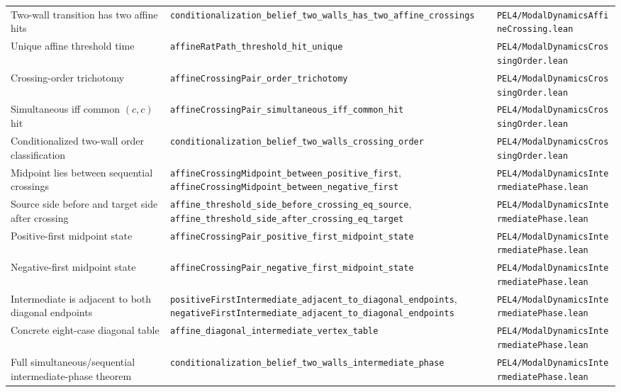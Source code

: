 \begin{longtable}{@{}p{}p{}p{}@{}}
\addlinespace
Two-wall transition has two affine hits & \texttt{conditionalization\_belief\_two\_walls\_has\_two\_affine\_crossings} & \texttt{PEL4/ModalDynamicsAffineCrossing.lean}\\
\addlinespace
Unique affine threshold time & \texttt{affineRatPath\_threshold\_hit\_unique} & \texttt{PEL4/ModalDynamicsCrossingOrder.lean}\\
\addlinespace
Crossing-order trichotomy & \texttt{affineCrossingPair\_order\_trichotomy} & \texttt{PEL4/ModalDynamicsCrossingOrder.lean}\\
\addlinespace
Simultaneous iff common \((c,c)\) hit & \texttt{affineCrossingPair\_simultaneous\_iff\_common\_hit} & \texttt{PEL4/ModalDynamicsCrossingOrder.lean}\\
\addlinespace
Conditionalized two-wall order classification & \texttt{conditionalization\_belief\_two\_walls\_crossing\_order} & \texttt{PEL4/ModalDynamicsCrossingOrder.lean}\\
\addlinespace
Midpoint lies between sequential crossings & \texttt{affineCrossingMidpoint\_between\_positive\_first}, \texttt{affineCrossingMidpoint\_between\_negative\_first} & \texttt{PEL4/ModalDynamicsIntermediatePhase.lean}\\
\addlinespace
Source side before and target side after crossing & \texttt{affine\_threshold\_side\_before\_crossing\_eq\_source}, \texttt{affine\_threshold\_side\_after\_crossing\_eq\_target} & \texttt{PEL4/ModalDynamicsIntermediatePhase.lean}\\
\addlinespace
Positive-first midpoint state & \texttt{affineCrossingPair\_positive\_first\_midpoint\_state} & \texttt{PEL4/ModalDynamicsIntermediatePhase.lean}\\
\addlinespace
Negative-first midpoint state & \texttt{affineCrossingPair\_negative\_first\_midpoint\_state} & \texttt{PEL4/ModalDynamicsIntermediatePhase.lean}\\
\addlinespace
Intermediate is adjacent to both diagonal endpoints & \texttt{positiveFirstIntermediate\_adjacent\_to\_diagonal\_endpoints}, \texttt{negativeFirstIntermediate\_adjacent\_to\_diagonal\_endpoints} & \texttt{PEL4/ModalDynamicsIntermediatePhase.lean}\\
\addlinespace
Concrete eight-case diagonal table & \texttt{affine\_diagonal\_intermediate\_vertex\_table} & \texttt{PEL4/ModalDynamicsIntermediatePhase.lean}\\
\addlinespace
Full simultaneous/sequential intermediate-phase theorem & \texttt{conditionalization\_belief\_two\_walls\_intermediate\_phase} & \texttt{PEL4/ModalDynamicsIntermediatePhase.lean}\\

\end{longtable}
